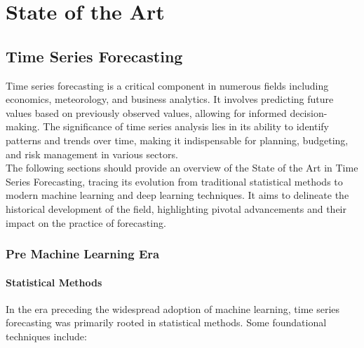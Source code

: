 \chapter{State of the Art}
\section{Time Series Forecasting}
Time series forecasting is a critical component in numerous fields including economics, meteorology, and business analytics. It involves predicting future values based on previously observed values, allowing for informed decision-making. The significance of time series analysis lies in its ability to identify patterns and trends over time, making it indispensable for planning, budgeting, and risk management in various sectors. \\

The following sections should provide an overview of the State of the Art in Time Series Forecasting, tracing its evolution from traditional statistical methods to modern machine learning and deep learning techniques. It aims to delineate the historical development of the field, highlighting pivotal advancements and their impact on the practice of forecasting. \\

\subsection{Pre Machine Learning Era}

\subsubsection{Statistical Methods \cite{cowpertwait2009introductory}}
In the era preceding the widespread adoption of machine learning, time series forecasting was primarily rooted in statistical methods. Some foundational techniques include:

